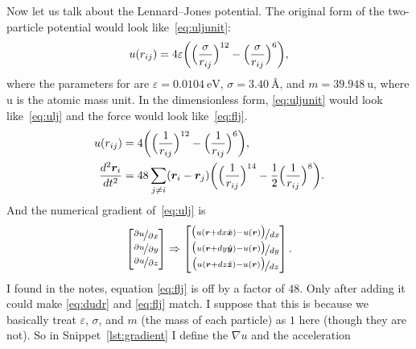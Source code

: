 Now let us talk about the Lennard--Jones potential.
The original form of the two-particle potential would look like~\eqref{eq:uljunit}:
%
\begin{equation}\label{eq:uljunit}
    u(r_{ij}) = 4 \varepsilon \biggl( \Bigl( \frac{ \sigma }{ r_{ij} } \Bigr)^{12}
    -\Bigl( \frac{ \sigma }{ r_{ij} } \Bigr)^6 \biggr),
\end{equation}
%
where the parameters for  are $\varepsilon = \SI{0.0104}{\electronvolt}$,
$\sigma = \SI{3.40}{\angstrom}$, and $m = \SI{39.948}{\atomicmassunit}$, where
$\si{\atomicmassunit}$ is the atomic mass unit.
In the dimensionless form,
\eqref{eq:uljunit} would look like~\eqref{eq:ulj} and the force would
look like~\eqref{eq:flj}.
%
\begin{align}
    u(r_{ij})                      & = 4 \biggl( \Bigl( \frac{ 1 }{ r_{ij} } \Bigr)^{12}
    -\Bigl( \frac{ 1 }{ r_{ij} } \Bigr)^6 \biggr), \label{eq:ulj}                        \\
    \frac{ d^2 \bm{r}_i }{ d t^2 } & = 48\sum_{j \neq i} (\bm{r}_i - \bm{r}_j)
    \biggl( \Bigl( \frac{ 1 }{ r_{ij} } \Bigr)^{14}
    -\frac{ 1 }{ 2 } \Bigl( \frac{ 1 }{ r_{ij} } \Bigr)^8 \biggr). \label{eq:flj}
\end{align}
%
And the numerical gradient of~\eqref{eq:ulj} is
%
\begin{equation}\label{eq:dudr}
    \begin{bmatrix}
        \nicefrac{ \partial u }{ \partial x } \\
        \nicefrac{ \partial u }{ \partial y } \\
        \nicefrac{ \partial u }{ \partial z }
    \end{bmatrix}
    \Rightarrow
    \begin{bmatrix}
        \nicefrac{ \bigl( u(\bm{r} + dx \hat{\bm{x}}) - u(\bm{r}) \bigr) }{ dx } \\
        \nicefrac{ \bigl( u(\bm{r} + dy \hat{\bm{y}}) - u(\bm{r}) \bigr) }{ dy } \\
        \nicefrac{ \bigl( u(\bm{r} + dz \hat{\bm{z}}) - u(\bm{r}) \bigr) }{ dz }
    \end{bmatrix}.
\end{equation}
%
I found in the notes, equation \eqref{eq:flj} is off by a factor of $48$.
Only after adding it could make \eqref{eq:dudr} and \eqref{eq:flj} match.
I suppose that this is because we basically treat
$\varepsilon$, $\sigma$, and $m$ (the mass of each particle) as $1$ here (though they
are not). So in Snippet~\ref{lst:gradient} I define the $\nabla u$ and the acceleration
